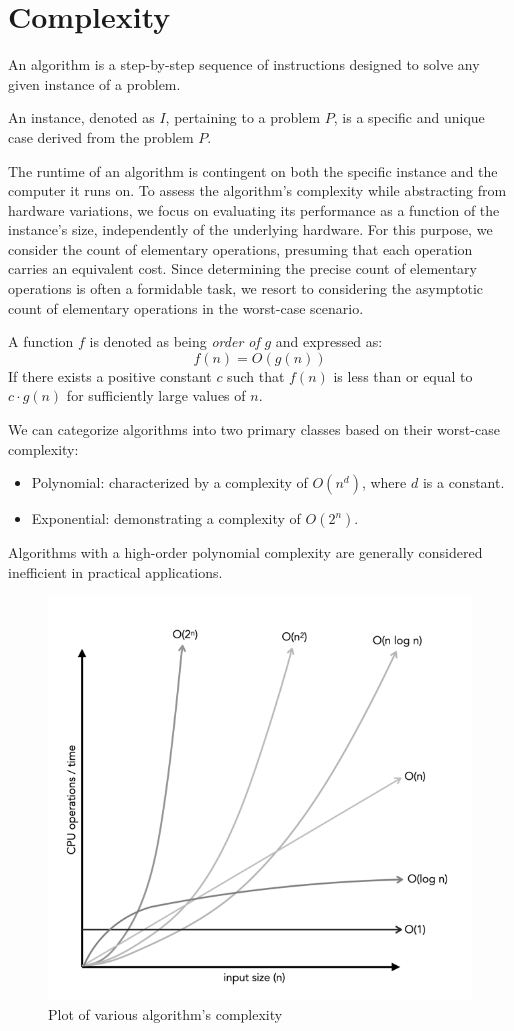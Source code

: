 \section{Complexity}

\begin{definition}
    An algorithm is a step-by-step sequence of instructions designed to solve any given instance of a problem.
\end{definition}
\begin{definition}
    An instance, denoted as $I$, pertaining to a problem $P$, is a specific and unique case derived from the problem $P$.
\end{definition}

The runtime of an algorithm is contingent on both the specific instance and the computer it runs on. 
To assess the algorithm's complexity while abstracting from hardware variations, we focus on evaluating its performance as a function of the instance's size, independently of the underlying hardware. 
For this purpose, we consider the count of elementary operations, presuming that each operation carries an equivalent cost. 
Since determining the precise count of elementary operations is often a formidable task, we resort to considering the asymptotic count of elementary operations in the worst-case scenario.
\begin{definition}
    A function $f$ is denoted as being \emph{order of} $g$ and expressed as:
    \[f(n)=O(g(n))\]
    If there exists a positive constant $c$ such that $f(n)$ is less than or equal to $c \cdot g(n)$ for sufficiently large values of $n$.
\end{definition}
We can categorize algorithms into two primary classes based on their worst-case complexity:
\begin{itemize}
    \item Polynomial: characterized by a complexity of $O(n^d)$, where $d$ is a constant.
    \item Exponential: demonstrating a complexity of $O(2^n)$. 
\end{itemize}
Algorithms with a high-order polynomial complexity are generally considered inefficient in practical applications.
\begin{figure}[H]
    \centering
    \includegraphics[width=0.5\linewidth]{images/complexity.png}
    \caption{Plot of various algorithm's complexity}
\end{figure}
